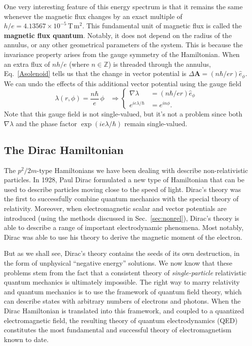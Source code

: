 \documentclass[pra,12pt]{revtex4}
\begin{document}
One very interesting feature of this energy spectrum is that it
remains the same whenever the magnetic flux changes by an exact
multiple of $h/e = 4.13567\times10^{-5}\,\mathrm{T}\,\mathrm{m}^2$.
This fundamental unit of magnetic flux is called the \textbf{magnetic
  flux quantum}.  Notably, it does not depend on the radius of the
annulus, or any other geometrical parameters of the system.  This is
because the invariance property arises from the gauge symmetry of the
Hamiltonian.  When an extra flux of $nh/e$ (where $n\in\mathbb{Z}$) is
threaded through the annulus, Eq.~\eqref{Asolenoid} tells us that the
change in vector potential is $\Delta \mathbf{A} = (n\hbar/ e r)
\hat{e}_\phi$.  We can undo the effects of this additional vector
potential using the gauge field
\begin{equation}
  \lambda(r,\phi) = \frac{n\hbar}{e} \, \phi \;\;\;\Rightarrow
  \begin{cases}\nabla \lambda &= \displaystyle (n\hbar/er) \hat{e}_\phi
    \\ \displaystyle e^{ie\lambda/\hbar} &= \displaystyle e^{in\phi}.
  \end{cases}
\end{equation}
Note that this gauge field is not single-valued, but it's not a
problem since both $\nabla\lambda$ and the phase factor
$\exp(ie\lambda/\hbar)$ remain single-valued.

\subsection{The Dirac Hamiltonian}

The $p^2/2m$-type Hamiltonians we have been dealing with describe
non-relativistic particles.  In 1928, Paul Dirac formulated a new type
of Hamiltonian that can be used to describe particles moving close to
the speed of light.  Dirac's theory was the first to successfully
combine quantum mechanics with the special theory of relativity.
Moreover, when electromagnetic scalar and vector potentials are
introduced (using the methods discussed in Sec.~\ref{sec:nonrel}),
Dirac's theory is able to describe a range of important electrodynamic
phenomena.  Most notably, Dirac was able to use his theory to derive
the magnetic moment of the electron.

But as we shall see, Dirac's theory contains the seeds of its own
destruction, in the form of unphysical ``negative energy'' solutions.
We now know that these problems stem from the fact that a consistent
theory of \textit{single-particle} relativistic quantum mechanics is
ultimately impossible.  The right way to marry relativity and quantum
mechanics is to use the framework of quantum field theory, which can
describe states with arbitrary numbers of electrons and photons.  When
the Dirac Hamiltonian is translated into this framework, and coupled
to a quantized electromagnetic field, the resulting theory of quantum
electrodynamics (QED) constitutes the most fundamental and successful
theory of electromagnetism known to date.
\end{document}
